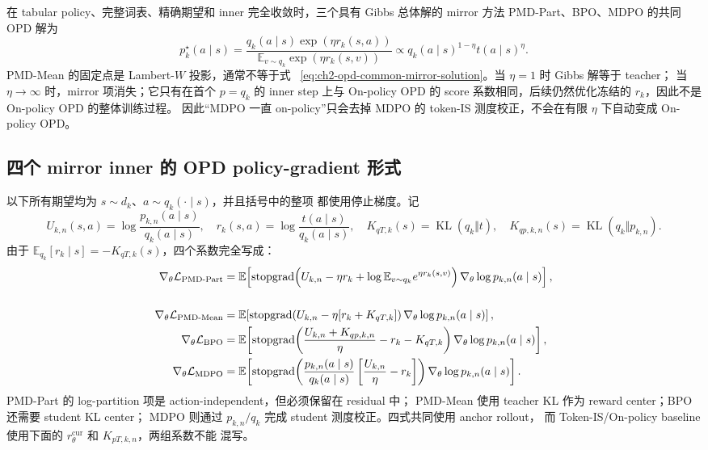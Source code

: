 在 tabular policy、完整词表、精确期望和 inner 完全收敛时，三个具有 Gibbs 总体解的 mirror 方法 PMD-Part、BPO、MDPO 的共同 OPD 解为
\begin{equation}
\label{eq:ch2-opd-common-mirror-solution}
p^{\star}_{k}(a\mid s)
=\frac{q_k(a\mid s)\exp(\eta r_k(s,a))}
{\mathbb E_{v\sim q_k}\exp(\eta r_k(s,v))}
\propto q_k(a\mid s)^{1-\eta}t(a\mid s)^{\eta}.
\end{equation}
PMD-Mean 的固定点是 Lambert-$W$ 投影，通常不等于式 ~\eqref{eq:ch2-opd-common-mirror-solution}。当 $\eta=1$ 时 Gibbs 解等于 teacher； 当 $\eta\to\infty$ 时，mirror 项消失；它只有在首个 $p=q_k$ 的 inner step 上与 On-policy OPD 的 score 系数相同，后续仍然优化冻结的 $r_k$，因此不是 On-policy OPD 的整体训练过程。 因此“MDPO 一直 on-policy”只会去掉 MDPO 的 token-IS 测度校正，不会在有限 $\eta$ 下自动变成 On-policy OPD。

\subsection{四个 mirror inner 的 OPD policy-gradient 形式}
\label{subsec:ch2-opd-four-inner-pg}

以下所有期望均为 $s\sim d_k$、$a\sim q_k(\cdot\mid s)$，并且括号中的整项 都使用停止梯度。记
\begin{equation}
U_{k,n}(s,a)=\log\frac{p_{k,n}(a\mid s)}{q_k(a\mid s)},
\quad
r_k(s,a)=\log\frac{t(a\mid s)}{q_k(a\mid s)},
\quad
K_{qT,k}(s)=\operatorname{KL}(q_k\Vert t),
\quad
K_{qp,k,n}(s)=\operatorname{KL}(q_k\Vert p_{k,n}).
\end{equation}
由于 $\mathbb E_{q_k}[r_k\mid s]=-K_{qT,k}(s)$，四个系数完全写成：
\begin{align}
\nabla_\theta\mathcal L_{\mathrm{PMD\text{-}Part}}
&=\mathbb E\!\left[\sg\!\left(
U_{k,n}-\eta r_k+\log\mathbb E_{v\sim q_k}e^{\eta r_k(s,v)}
\right)\nabla_\theta\log p_{k,n}(a\mid s)\right],
\label{eq:ch2-opd-pg-pmd-part}\\
\\
\nabla_\theta\mathcal L_{\mathrm{PMD\text{-}Mean}}
&=\mathbb E\!\left[\sg\!\left(
U_{k,n}-\eta[r_k+K_{qT,k}]\right)\nabla_\theta\log p_{k,n}(a\mid s)\right],
\label{eq:ch2-opd-pg-pmd-mean}\\
\nabla_\theta\mathcal L_{\mathrm{BPO}}
&=\mathbb E\!\left[\sg\!\left(
\frac{U_{k,n}+K_{qp,k,n}}\eta-r_k-K_{qT,k}\right)\nabla_\theta\log p_{k,n}(a\mid s)\right],
\label{eq:ch2-opd-pg-bpo}\\
\nabla_\theta\mathcal L_{\mathrm{MDPO}}
&=\mathbb E\!\left[\sg\!\left(
\frac{p_{k,n}(a\mid s)}{q_k(a\mid s)}
\left[\frac{U_{k,n}}\eta-r_k\right]\right)
\nabla_\theta\log p_{k,n}(a\mid s)\right].
\label{eq:ch2-opd-pg-mdpo}
\end{align}
PMD-Part 的 log-partition 项是 action-independent，但必须保留在 residual 中； PMD-Mean 使用 teacher KL 作为 reward center；BPO 还需要 student KL center； MDPO 则通过 $p_{k,n}/q_k$ 完成 student 测度校正。四式共同使用 anchor rollout， 而 Token-IS/On-policy baseline 使用下面的 $r_\theta^{\mathrm{cur}}$ 和 $K_{pT,k,n}$，两组系数不能 混写。


